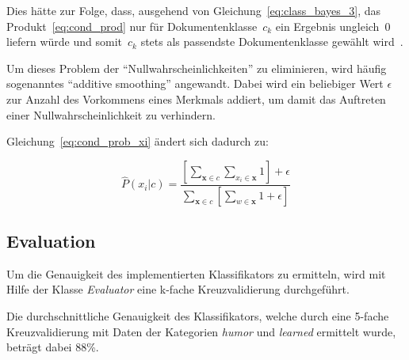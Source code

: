         Dies hätte zur Folge, dass, ausgehend von Gleichung~\ref{eq:class_bayes_3}, das Produkt~\ref{eq:cond_prod} nur für Dokumentenklasse~$c_{k}$ ein Ergebnis ungleich~$0$ liefern würde und somit~$c_{k}$ stets als passendste Dokumentenklasse gewählt wird~\cite{IIR}.


        Um dieses Problem der ``Nullwahrscheinlichkeiten'' zu eliminieren, wird häufig sogenanntes ``additive smoothing'' angewandt.
        Dabei wird ein beliebiger Wert $\epsilon$ zur Anzahl des Vorkommens eines Merkmals addiert, um damit das Auftreten einer Nullwahrscheinlichkeit zu verhindern.

        Gleichung~\ref{eq:cond_prob_xi} ändert sich dadurch zu:

        \begin{equation}
            \hat{P}(x_{i}|c) = \frac{\left[\sum_{\mathbf{x} \in c}\sum_{x_{i} \in \mathbf{x}}1\right]+\epsilon}{\sum_{\mathbf{x} \in c}\left[\sum_{w \in \mathbf{x}}1+\epsilon\right]}
            \label{eq:add_one}
        \end{equation}

    \subsection{Evaluation}
        Um die Genauigkeit des implementierten Klassifikators zu ermitteln, wird mit Hilfe der Klasse \textit{Evaluator} eine k-fache Kreuzvalidierung durchgeführt. 

        Die durchschnittliche Genauigkeit des Klassifikators, welche durch eine 5-fache Kreuzvalidierung mit Daten der Kategorien \textit{humor} und \textit{learned} ermittelt wurde, beträgt dabei 88\%.
